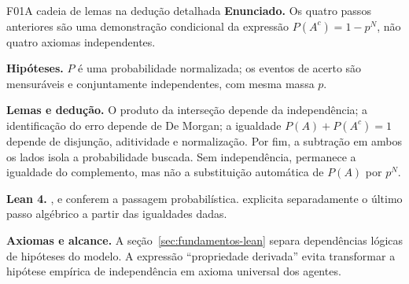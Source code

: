 \begin{formalizacao}{F01}{A cadeia de lemas na dedução detalhada}
\textbf{Enunciado.} Os quatro passos anteriores são uma demonstração condicional da expressão $P(A^c)=1-p^N$, não quatro axiomas independentes.

\textbf{Hipóteses.} $P$ é uma probabilidade normalizada; os eventos de acerto são mensuráveis e conjuntamente independentes, com mesma massa $p$.

\textbf{Lemas e dedução.} O produto da interseção depende da independência; a identificação do erro depende de De Morgan; a igualdade $P(A)+P(A^c)=1$ depende de disjunção, aditividade e normalização. Por fim, a subtração em ambos os lados isola a probabilidade buscada. Sem independência, permanece a igualdade do complemento, mas não a substituição automática de $P(A)$ por $p^N$.

\textbf{Lean 4.} ,  e  conferem a passagem probabilística.  explicita separadamente o último passo algébrico a partir das igualdades dadas.

\textbf{Axiomas e alcance.} A seção~\ref{sec:fundamentos-lean} separa dependências lógicas de hipóteses do modelo. A expressão ``propriedade derivada'' evita transformar a hipótese empírica de independência em axioma universal dos agentes.
\end{formalizacao}

